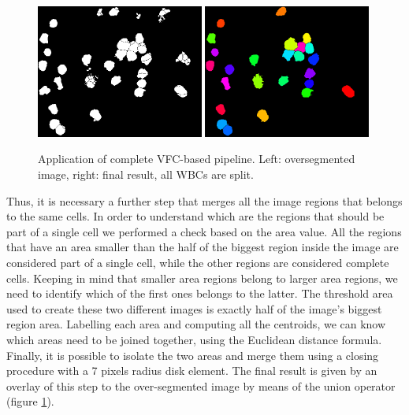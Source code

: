 \documentclass[final,a4paper,12pt,english]{UnicaPhdThesis3}
\begin{document}
	\begin{figure}[!b]
		\centering
		\includegraphics[width=0.49\textwidth]{images/2018_1_visapp/figure8.png}
		\includegraphics[width=0.49\textwidth]{images/2018_1_visapp/detection.png}
		\caption{\label{fig:vfc2}Application of complete VFC-based pipeline. Left: oversegmented image, right: final result, all WBCs are split.}
	\end{figure}
	Thus, it is necessary a further step that merges all the image regions that belongs to the same cells. In order to understand which are the regions that should be part of a single cell we performed a check based on the area value.
	All the regions that have an area smaller than the half of the biggest region inside the image are considered part of a single cell, while the other regions are considered complete cells.
	Keeping in mind that smaller area regions belong to larger area regions, we need to identify which of the first ones belongs to the latter. The threshold area used to create these two different images is exactly half of the image's biggest region area. Labelling each area and computing all the centroids, we can know which areas need to be joined together, using the Euclidean distance formula. Finally, it is possible to isolate the two areas and merge them using a closing procedure with a 7 pixels radius disk element. The final result is given by an overlay of this step to the over-segmented image by means of the union operator (figure \ref{fig:vfc2}).
	
\end{document}
